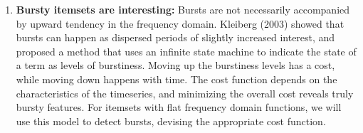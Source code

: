 \documentclass[11pt]{llncs} %
\begin{document}
\begin{enumerate}
\item {\bf Bursty itemsets are interesting:} Bursts are not necessarily accompanied by upward tendency in the frequency domain. Kleiberg (2003) showed that bursts can happen as dispersed periods of slightly increased interest, and proposed a method that uses an infinite state machine to indicate the state of a term as levels of burstiness. Moving up the burstiness levels has a cost, while moving down happens with time. The cost function depends on the characteristics of the timeseries, and minimizing the overall cost reveals truly bursty features. For itemsets with flat frequency domain functions, we will use this model to detect bursts, devising the appropriate cost function.

\end{enumerate}
\end{document}
